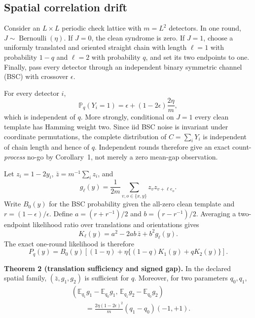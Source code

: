 \documentclass[letterpaper,journal]{IEEEtran}
\newcommand{\E}{\mathbb E}
\newcommand{\Prb}{\mathbb P}
\begin{document}
\subsection{Spatial correlation drift}

Consider an $L\times L$ periodic check lattice with $m=L^2$ detectors. In one
round, $J\sim\operatorname{Bernoulli}(\eta)$. If $J=0$, the clean syndrome is
zero. If $J=1$, choose a uniformly translated and oriented straight chain
with length $\ell=1$ with probability $1-q$ and $\ell=2$ with probability
$q$, and set its two endpoints to one. Finally, pass every detector through an
independent binary symmetric channel (BSC) with crossover $\epsilon$.

For every detector $i$,
\begin{equation}
\Prb_q(Y_i=1)=\epsilon+(1-2\epsilon)\frac{2\eta}{m},
\label{eq:marginal}
\end{equation}
which is independent of $q$. More strongly, conditional on $J=1$ every clean
template has Hamming weight two. Since iid BSC noise is invariant under
coordinate permutations, the complete distribution of
$C=\sum_iY_i$ is independent of chain length and hence of $q$. Independent
rounds therefore give an exact count-\emph{process} no-go by Corollary~1,
not merely a zero mean-gap observation.

Let $z_i=1-2y_i$, $\bar z=m^{-1}\sum_i z_i$, and
\begin{equation}
g_\ell(y)=\frac{1}{2m}\sum_{v,o\in\{x,y\}}
z_vz_{v+\ell e_o}.
\label{eq:gell}
\end{equation}
Write $B_0(y)$ for the BSC probability given the all-zero clean template and
$r=(1-\epsilon)/\epsilon$. Define
$a=(r+r^{-1})/2$ and $b=(r-r^{-1})/2$. Averaging a two-endpoint likelihood
ratio over translations and orientations gives
\begin{equation}
K_\ell(y)=a^2-2ab\,\bar z+b^2g_\ell(y).
\label{eq:kell}
\end{equation}
The exact one-round likelihood is therefore
\begin{equation}
P_q(y)=B_0(y)\left[(1-\eta)+
\eta\{(1-q)K_1(y)+qK_2(y)\}\right].
\label{eq:spatial-likelihood}
\end{equation}

\textbf{Theorem 2 (translation sufficiency and signed gap).}
In the declared spatial family, $(\bar z,g_1,g_2)$ is sufficient for $q$.
Moreover, for two parameters $q_0,q_1$,
\begin{equation}
\begin{split}
&\left(\E_{q_1}g_1-\E_{q_0}g_1,\,
\E_{q_1}g_2-\E_{q_0}g_2\right)\\
&\qquad =
\frac{2\eta(1-2\epsilon)^2}{m}(q_1-q_0)(-1,+1).
\end{split}
\label{eq:pair-gap}
\end{equation}
\end{document}

